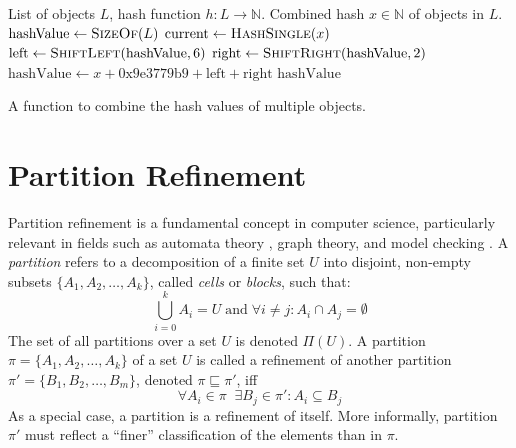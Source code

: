 		\begin{algorithm}[ht!]
			\centering
			\begin{algorithmic}
				\Require List of objects $L$, hash function $h: L \rightarrow \mathbb{N}$.
				\Ensure Combined hash $x \in \mathbb{N}$ of objects in $L$.
				\Statex
				\State $\mathrm{hashValue} \gets \Call{SizeOf}{L}$
					\State $\mathrm{current} \gets \Call{HashSingle}{x}$
					\State $\mathrm{left} \gets \Call{ShiftLeft}{\mathrm{hashValue}, 6}$
					\State $\mathrm{right} \gets \Call{ShiftRight}{\mathrm{hashValue}, 2}$
					\State $\mathrm{hashValue} \gets x + \mathrm{0x9e3779b9} + \mathrm{left} + \mathrm{right}$
				\EndFor
				\State \Return $\mathrm{hashValue}$
				\EndFunction
			\end{algorithmic}
			\caption{A function to combine the hash values of multiple objects.}
			\label{algo:prelims:hash:combined}
		\end{algorithm}
		
		\clearpage
	
	\section{Partition Refinement}
	\label{chap:prelims:partitionref}
		Partition refinement is a fundamental concept in computer science, particularly relevant in fields such as automata theory \cite{hopcroftLogALGORITHMMINIMIZING1971a}, graph theory, and model checking \cite{baierPrinciplesModelChecking2008}.
		A \textit{partition} refers to a decomposition of a finite set $U$ into disjoint, non-empty subsets $\{ A_1, A_2, \ldots, A_k \}$, called \textit{cells} or \textit{blocks}, such that:
		\begin{equation*}
			\bigcup^k_{i=0} A_i = U \; \mathrm{and} \; \forall i \neq j: A_i \cap A_j = \emptyset
		\end{equation*}
		The set of all partitions over a set $U$ is denoted $\Pi(U)$. A partition $\pi = \{ A_1, A_2, \ldots, A_k \}$ of a set $U$ is called a refinement of another partition $\pi' = \{ B_1, B_2, \ldots, B_m \}$, denoted $\pi \sqsubseteq \pi'$, iff
		\begin{equation*}
			\forall A_i \in \pi \;\; \exists B_j \in \pi' : A_i \subseteq B_j
		\end{equation*} 
		As a special case, a partition is a refinement of itself.
		More informally, partition $\pi'$ must reflect a \enquote{finer} classification of the elements than in $\pi$. 
		
